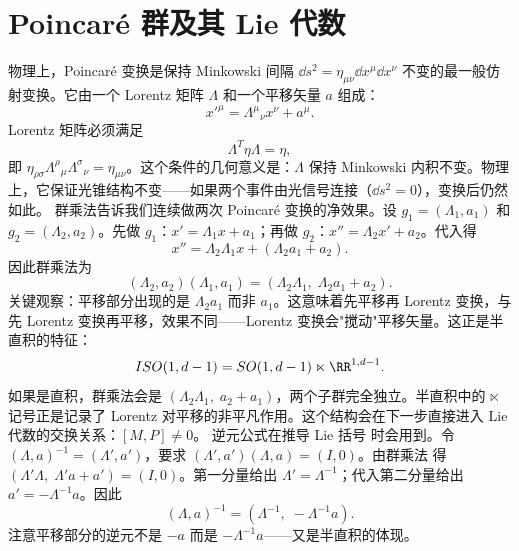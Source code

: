 \section{Poincaré 群及其 Lie 代数}
物理上，Poincaré 变换是保持 Minkowski 间隔 $\dd s^2=\eta_{\mu\nu}\dd x^\mu \dd x^\nu$ 不变的最一般仿射变换。它由一个 Lorentz 矩阵 $\Lambda$ 和一个平移矢量 $a$ 组成：
\begin{equation*}x'^\mu=\Lambda^\mu{}_\nu x^\nu+a^\mu.
\end{equation*}
Lorentz 矩阵必须满足
\begin{equation}\label{eq:ms-poincare-lorentz-def}
{\Lambda^T\eta\Lambda=\eta,}
\end{equation}
即 $\eta_{\rho\sigma}\Lambda^\rho{}_\mu\Lambda^\sigma{}_\nu=\eta_{\mu\nu}$。这个条件的几何意义是：$\Lambda$ 保持 Minkowski 内积不变。物理上，它保证光锥结构不变——如果两个事件由光信号连接（$\dd s^2=0$），变换后仍然如此。
群乘法告诉我们连续做两次 Poincaré 变换的净效果。设 $g_1=(\Lambda_1,a_1)$ 和 $g_2=(\Lambda_2,a_2)$。先做 $g_1$：$x'=\Lambda_1 x+a_1$；再做 $g_2$：$x''=\Lambda_2 x'+a_2$。代入得
\begin{equation}
x''=\Lambda_2\Lambda_1 x+(\Lambda_2 a_1+a_2).
\end{equation}
因此群乘法为
\begin{equation}\label{eq:ms-poincare-semidirect}
{
(\Lambda_2,a_2)(\Lambda_1,a_1)=(\Lambda_2\Lambda_1,\;\Lambda_2 a_1+a_2).
}
\end{equation}
关键观察：平移部分出现的是 $\Lambda_2 a_1$ 而非 $a_1$。这意味着先平移再 Lorentz 变换，与先 Lorentz 变换再平移，效果不同——Lorentz 变换会"搅动"平移矢量。这正是半直积的特征：
\begin{equation}
ISO(1,d-1)=SO(1,d-1)\ltimes\RR^{1,d-1}.
\end{equation}
如果是直积，群乘法会是 $(\Lambda_2\Lambda_1,\;a_2+a_1)$，两个子群完全独立。半直积中的 $\ltimes$ 记号正是记录了 Lorentz 对平移的非平凡作用。这个结构会在下一步直接进入 Lie 代数的交换关系：$[M,P]\neq 0$。
逆元公式在推导 Lie 括号 时会用到。令 $(\Lambda,a)^{-1}=(\Lambda',a')$，要求 $(\Lambda',a')(\Lambda,a)=(I,0)$。由群乘法 得 $(\Lambda'\Lambda,\;\Lambda'a+a')=(I,0)$。第一分量给出 $\Lambda'=\Lambda^{-1}$；代入第二分量给出 $a'=-\Lambda^{-1}a$。因此
\begin{equation}\label{eq:ms-poincare-inverse}
(\Lambda,a)^{-1}=(\Lambda^{-1},\;-\Lambda^{-1}a).
\end{equation}
注意平移部分的逆元不是 $-a$ 而是 $-\Lambda^{-1}a$——又是半直积的体现。

